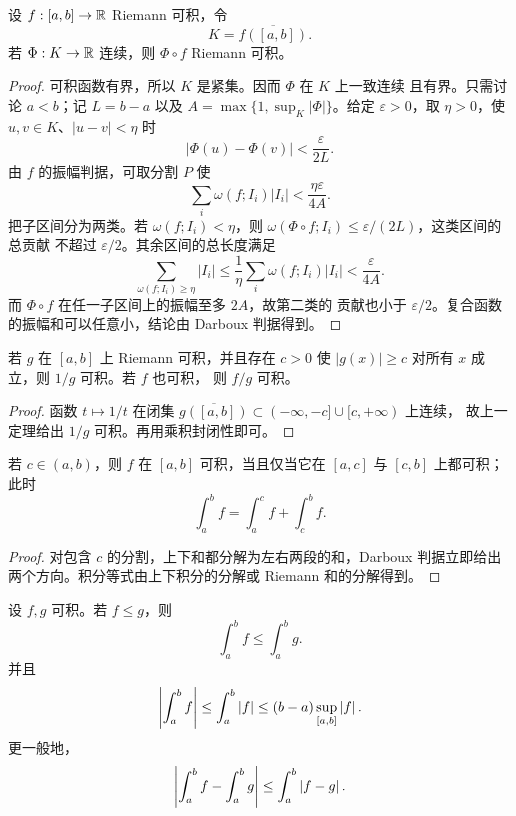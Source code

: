 \begin{theorem}[连续复合的可积性]
\label{thm:riemann-continuous-composition}
设 \(f:[a,b]\to\mathbb{R}\) Riemann 可积，令
\[
 K=\overline{f([a,b])}.
\]
若 \(\Phi:K\to\mathbb{R}\) 连续，则 \(\Phi\circ f\) Riemann 可积。
\end{theorem}

\begin{proof}
可积函数有界，所以 \(K\) 是紧集。因而 \(\Phi\) 在 \(K\) 上一致连续
且有界。只需讨论 \(a<b\)；记 \(L=b-a\) 以及
\(A=\max\{1,\sup_K|\Phi|\}\)。给定 \(\varepsilon>0\)，取
\(\eta>0\)，使 \(u,v\in K\)、\(|u-v|<\eta\) 时
\[
 |\Phi(u)-\Phi(v)|<\frac{\varepsilon}{2L}.
\]
由 \(f\) 的振幅判据，可取分割 \(P\) 使
\[
 \sum_i\omega(f;I_i)|I_i|
 <\frac{\eta\varepsilon}{4A}.
\]
把子区间分为两类。若 \(\omega(f;I_i)<\eta\)，则
\(\omega(\Phi\circ f;I_i)\le\varepsilon/(2L)\)，这类区间的总贡献
不超过 \(\varepsilon/2\)。其余区间的总长度满足
\[
 \sum_{\omega(f;I_i)\ge\eta}|I_i|
 \le \frac1\eta\sum_i\omega(f;I_i)|I_i|
 <\frac{\varepsilon}{4A}.
\]
而 \(\Phi\circ f\) 在任一子区间上的振幅至多 \(2A\)，故第二类的
贡献也小于 \(\varepsilon/2\)。复合函数的振幅和可以任意小，结论由
Darboux 判据得到。
\end{proof}

\begin{corollary}[倒数与商]
\label{cor:riemann-reciprocal-quotient}
若 \(g\) 在 \([a,b]\) 上 Riemann 可积，并且存在 \(c>0\) 使
\(|g(x)|\ge c\) 对所有 \(x\) 成立，则 \(1/g\) 可积。若 \(f\) 也可积，
则 \(f/g\) 可积。
\end{corollary}

\begin{proof}
函数 \(t\mapsto1/t\) 在闭集
\(\overline{g([a,b])}\subset(-\infty,-c]\cup[c,+\infty)\) 上连续，
故上一定理给出 \(1/g\) 可积。再用乘积封闭性即可。
\end{proof}

\begin{theorem}[区间可加性]
\label{thm:riemann-interval-additivity}
若 \(c\in(a,b)\)，则 \(f\) 在 \([a,b]\) 可积，当且仅当它在
\([a,c]\) 与 \([c,b]\) 上都可积；此时
\[
 \int_a^b f=\int_a^c f+\int_c^b f.
\]
\end{theorem}

\begin{proof}
对包含 \(c\) 的分割，上下和都分解为左右两段的和，Darboux 判据立即给出
两个方向。积分等式由上下积分的分解或 Riemann 和的分解得到。
\end{proof}

\begin{theorem}[序性质与基本估计]
\label{thm:riemann-order-estimates}
设 \(f,g\) 可积。若 \(f\le g\)，则
\[
 \int_a^b f\le\int_a^b g.
\]
并且
\[
 \left|\int_a^b f\right|
 \le\int_a^b\left|f\right|
 \le (b-a)\sup_{[a,b]}\left|f\right|.
\]
更一般地，
\[
 \left|\int_a^b f-\int_a^b g\right|
 \le\int_a^b\left|f-g\right|.
\]
\end{theorem}

